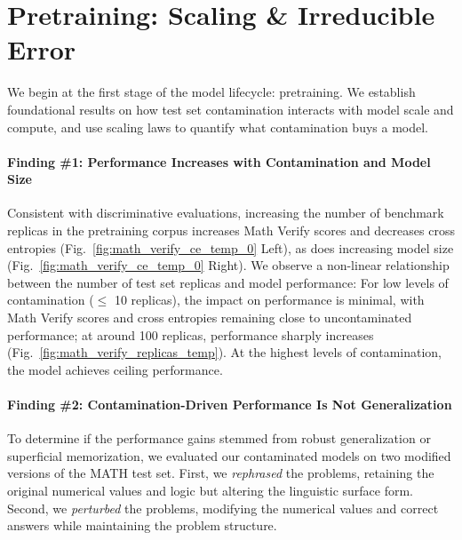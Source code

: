 \section{Pretraining: Scaling \& Irreducible Error}
\label{sec:pretraining}

We begin at the first stage of the model lifecycle: pretraining.
We establish foundational results on how test set contamination interacts with model scale and compute, and use scaling laws to quantify what contamination buys a model.

\paragraph{Finding \#1: Performance Increases with Contamination and Model Size} Consistent with discriminative evaluations, increasing the number of benchmark replicas in the pretraining corpus increases Math Verify scores and decreases cross entropies (Fig.~\ref{fig:math_verify_ce_temp_0} Left), as does increasing model size (Fig.~\ref{fig:math_verify_ce_temp_0} Right). %
We observe a non-linear relationship between the number of test set replicas and model performance:
For low levels of contamination ($\leq$ 10 replicas), the impact on performance is minimal, with Math Verify scores and cross entropies remaining close to uncontaminated performance; at around 100 replicas, performance sharply increases (Fig.~\ref{fig:math_verify_replicas_temp}).
At the highest levels of contamination, the model achieves ceiling performance.

\paragraph{Finding \#2: Contamination-Driven Performance Is Not Generalization}
To determine if the performance gains stemmed from robust generalization or superficial memorization, we evaluated our contaminated models on two modified versions of the MATH test set. First, we \emph{rephrased} the problems, retaining the original numerical values and logic but altering the linguistic surface form. Second, we \emph{perturbed} the problems, modifying the numerical values and correct answers while maintaining the problem structure.

